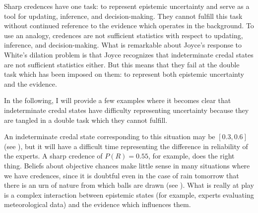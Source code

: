 Sharp credences have one task: to represent epistemic
uncertainty and serve as a tool for updating,
inference, and decision-making. They cannot fulfill
this task without continued reference to the evidence
which operates in the background. To use an analogy,
credences are not sufficient statistics with respect to
updating, inference, and decision-making. What is
remarkable about Joyce's response to White's dilation
problem is that Joyce recognizes that indeterminate
credal states are not sufficient statistics either. But
this means that they fail at the double task which has
been imposed on them: to represent both epistemic
uncertainty and the evidence.

In the following, I will provide a few examples where
it becomes clear that indeterminate credal states have
difficulty representing uncertainty because they are
tangled in a double task which they cannot fulfill.


An indeterminate credal state corresponding to this
situation may be $[0.3,0.6]$ (see
), but it will have a difficult
time representing the difference in reliability of the
experts. A sharp credence of $P(R)=0.55$, for example,
does the right thing. Beliefs about objective chances
make little sense in many situations where we have
credences, since it is doubtful even in the case of
rain tomorrow that there is an urn of nature from which
balls are drawn (see ). What is
really at play is a complex interaction between
epistemic states (for example, experts evaluating
meteorological data) and the evidence which influences
them.


